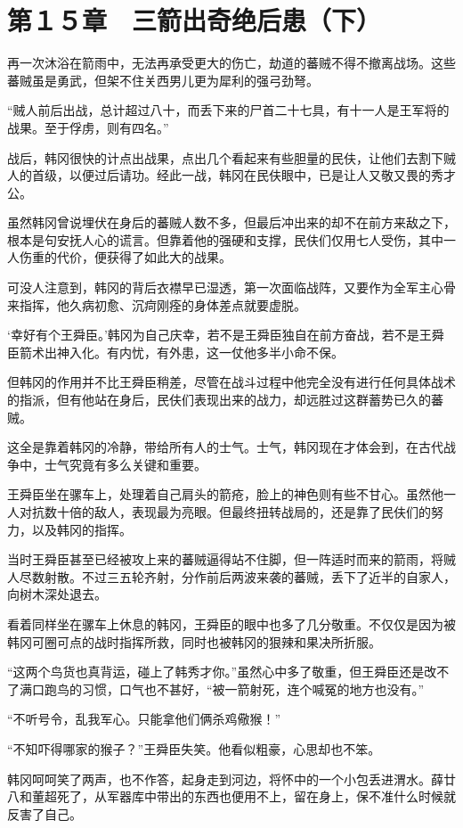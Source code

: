 \section{第１５章　三箭出奇绝后患（下）}

再一次沐浴在箭雨中，无法再承受更大的伤亡，劫道的蕃贼不得不撤离战场。这些蕃贼虽是勇武，但架不住关西男儿更为犀利的强弓劲弩。

“贼人前后出战，总计超过八十，而丢下来的尸首二十七具，有十一人是王军将的战果。至于俘虏，则有四名。”

战后，韩冈很快的计点出战果，点出几个看起来有些胆量的民伕，让他们去割下贼人的首级，以便过后请功。经此一战，韩冈在民伕眼中，已是让人又敬又畏的秀才公。

虽然韩冈曾说埋伏在身后的蕃贼人数不多，但最后冲出来的却不在前方来敌之下，根本是句安抚人心的谎言。但靠着他的强硬和支撑，民伕们仅用七人受伤，其中一人伤重的代价，便获得了如此大的战果。

可没人注意到，韩冈的背后衣襟早已湿透，第一次面临战阵，又要作为全军主心骨来指挥，他久病初愈、沉疴刚痊的身体差点就要虚脱。

‘幸好有个王舜臣。’韩冈为自己庆幸，若不是王舜臣独自在前方奋战，若不是王舜臣箭术出神入化。有内忧，有外患，这一仗他多半小命不保。

但韩冈的作用并不比王舜臣稍差，尽管在战斗过程中他完全没有进行任何具体战术的指派，但有他站在身后，民伕们表现出来的战力，却远胜过这群蓄势已久的蕃贼。

这全是靠着韩冈的冷静，带给所有人的士气。士气，韩冈现在才体会到，在古代战争中，士气究竟有多么关键和重要。

王舜臣坐在骡车上，处理着自己肩头的箭疮，脸上的神色则有些不甘心。虽然他一人对抗数十倍的敌人，表现最为亮眼。但最终扭转战局的，还是靠了民伕们的努力，以及韩冈的指挥。

当时王舜臣甚至已经被攻上来的蕃贼逼得站不住脚，但一阵适时而来的箭雨，将贼人尽数射散。不过三五轮齐射，分作前后两波来袭的蕃贼，丢下了近半的自家人，向树木深处退去。

看着同样坐在骡车上休息的韩冈，王舜臣的眼中也多了几分敬重。不仅仅是因为被韩冈可圈可点的战时指挥所救，同时也被韩冈的狠辣和果决所折服。

“这两个鸟货也真背运，碰上了韩秀才你。”虽然心中多了敬重，但王舜臣还是改不了满口跑鸟的习惯，口气也不甚好，“被一箭射死，连个喊冤的地方也没有。”

“不听号令，乱我军心。只能拿他们俩杀鸡儆猴！”

“不知吓得哪家的猴子？”王舜臣失笑。他看似粗豪，心思却也不笨。

韩冈呵呵笑了两声，也不作答，起身走到河边，将怀中的一个小包丢进渭水。薛廿八和董超死了，从军器库中带出的东西也便用不上，留在身上，保不准什么时候就反害了自己。

